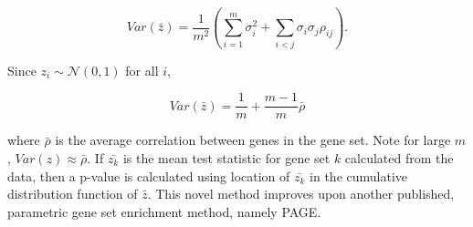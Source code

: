 \begin{equation}
Var( \bar{z} ) = \frac{1}{m^2} 
                 \left(   
                   \sum\limits_{i=1}^m \sigma{}_i^2 + 
                   \sum\limits_{i<j} \sigma{}_i \sigma{}_j \rho_{ij}
                 \right).
\end{equation}

Since $z_i \sim \mathcal{N}(0,1)$ for all $i$,

\begin{equation}
Var( \bar{z} ) = \frac{1}{m}  + \frac{m-1}{m}\bar{\rho}
\end{equation}

where $\bar{\rho}$ is the average correlation between genes in the gene set. Note for
large $m$, $Var(z) \approx \bar{\rho}$. If $\bar{z_k}$ is the 
mean test statistic for gene set $k$ calculated from the data, then a p-value
is calculated using location of $\bar{z_k}$ in the cumulative distribution 
function of $\bar{z}$. This novel method improves upon another published, parametric gene
set enrichment method, namely PAGE.\autocite{Kim2005}










